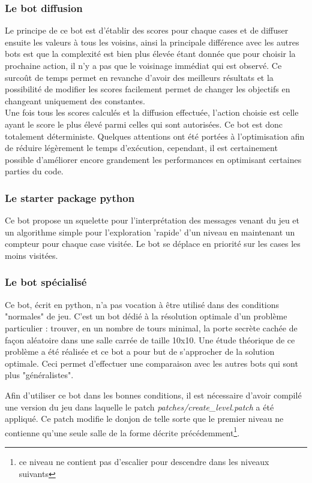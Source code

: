 \documentclass[a4paper,12pt]{article}
\begin{document}
\subsubsection{Le bot diffusion}
Le principe de ce bot est d'établir des scores pour chaque cases et de diffuser
ensuite les valeurs à tous les voisins, ainsi la principale différence avec les
autres bots est que la complexité est bien plus élevée étant donnée que pour
choisir la prochaine action, il n'y a pas que le voisinage immédiat qui est
observé. Ce surcoût de temps permet en revanche d'avoir des meilleurs résultats
et la possibilité de modifier les scores facilement permet de changer les
objectifs en changeant uniquement des constantes.
\\
Une fois tous les scores calculés et la diffusion effectuée, l'action choisie
est celle ayant le score le plus élevé parmi celles qui sont autorisées. Ce bot
est donc totalement déterministe. Quelques attentions ont été portées à
l'optimisation afin de réduire légèrement le temps d'exécution, cependant, il
est certainement possible d'améliorer encore grandement les performances en
optimisant certaines parties du code.

\subsubsection{Le starter package python}

Ce bot propose un squelette pour l'interprétation des messages venant du jeu et un algorithme simple pour l'exploration 'rapide' d'un niveau en maintenant un compteur pour chaque case visitée. Le bot se déplace en priorité sur les cases les moins visitées.

\subsubsection{Le bot spécialisé}

Ce bot, écrit en python, n'a pas vocation à être utilisé dans des conditions "normales" de jeu. C'est un bot dédié à la résolution optimale d'un problème particulier : trouver, en un nombre de tours minimal, la porte secrète cachée de façon aléatoire dans une salle carrée de taille 10x10. Une étude théorique de ce problème a été réalisée et ce bot a pour but de s'approcher de la solution optimale. Ceci permet d'effectuer une comparaison avec les autres bots qui sont plus "généralistes".

Afin d'utiliser ce bot dans les bonnes conditions, il est nécessaire d'avoir compilé une version du jeu dans laquelle le patch \emph{patches/create\_level.patch} a été appliqué. Ce patch modifie le donjon de telle sorte que le premier niveau ne contienne qu'une seule salle de la forme décrite précédemment\footnote{ce niveau ne contient pas d'escalier pour descendre dans les niveaux suivants}.
\end{document}
